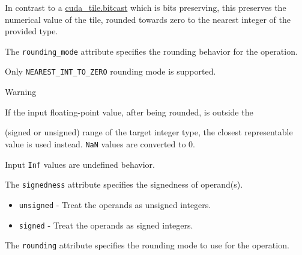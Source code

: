 \documentclass{article}
\begin{document}
In contrast to a \href{https://docs.nvidia.com/cuda/tile-ir/latest/sections/operations.html#op-cuda-tile-bitcast}{cuda\_tile.bitcast} which is bits preserving, this preserves the numerical value of the tile, rounded towards zero to the nearest integer of the provided type.


The \texttt{rounding\_mode} attribute specifies the rounding behavior for the operation.

Only \texttt{NEAREST\_INT\_TO\_ZERO} rounding mode is supported.


Warning


If the input floating-point value, after being rounded, is outside the

(signed or unsigned) range of the target integer type, the closest representable value is used instead. \texttt{NaN} values are converted to 0.

Input \texttt{Inf} values are undefined behavior.


The \texttt{signedness} attribute specifies the signedness of operand(s).


\begin{itemize}
\item \texttt{unsigned} - Treat the operands as unsigned integers.
\item \texttt{signed} - Treat the operands as signed integers.

\end{itemize}
The \texttt{rounding} attribute specifies the rounding mode to use for the operation.
\end{document}
